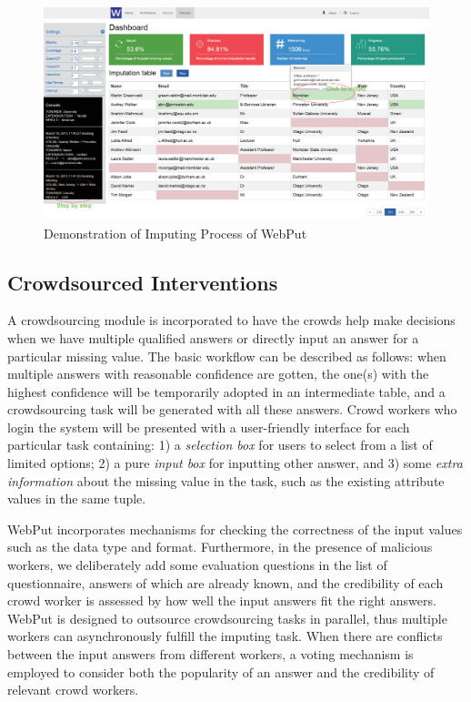 \documentclass[sigconf]{acmart}
\begin{document}
\begin{figure}
  \centerline{\includegraphics[width=15cm]{images/process_.eps}}
  \caption{Demonstration of Imputing Process of WebPut}
  \label{fig:process}
\end{figure}

\subsection{Crowdsourced Interventions}
%
A crowdsourcing module is incorporated to have the crowds help make decisions when we have multiple qualified answers or directly input an answer for a particular missing value.
%
The basic workflow can be described as follows: when multiple answers with reasonable confidence are gotten, the one(s) with the highest confidence will be temporarily adopted in an intermediate table, and a crowdsourcing task will be generated with all these answers. Crowd workers who login the system will be presented with a user-friendly interface for each particular task containing: 1) a {\em selection box} for users to select from a list of limited options; 2) a pure {\em input box} for inputting other answer, and 3) some {\em extra information} about the missing value in the task, such as the existing attribute values in the same tuple.

WebPut incorporates mechanisms for checking the correctness of the input values such as the data type and format. Furthermore, in the presence of malicious workers, we deliberately add some evaluation questions in the list of questionnaire, answers of which are already known, and the credibility of each crowd worker is assessed by how well the input answers fit the right answers.
%
WebPut is designed to outsource crowdsourcing tasks in parallel, thus multiple workers can asynchronously fulfill the imputing task. When there are conflicts between the input answers from different workers, a voting mechanism is employed to consider both the popularity of an answer and the credibility of relevant crowd workers.
\end{document}
